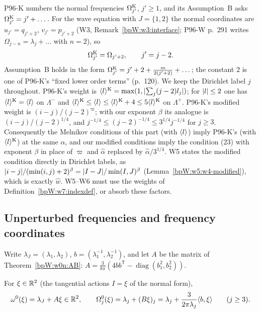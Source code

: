 \begin{remark}\label{bpW:w7:reindex}
P96-K numbers the normal frequencies $\Omega^{\rm K}_{j'}$, $j'\ge1$, and its Assumption~B asks $\Omega^{\rm K}_{j'}
=j'+\dots$. For the wave equation with $J=\{1,2\}$ the normal coordinates are $u_{j'}=q_{j'+2}$, $v_{j'}=p_{j'+2}$
(W3, Remark~\ref{bpW:w3:interface}; P96-W p.~291 writes $\Omega_{j-n}=\lambda_j+\dots$ with $n=2$), so
\[\Omega^{\rm K}_{j'}=\Omega_{j'+2},\qquad j'=j-2.\]
Assumption~B holds in the form $\Omega^{\rm K}_{j'}=j'+2+\frac{m}{2(j'+2)}+\dots$; the constant $2$ is one of P96-K's
``fixed lower order terms'' (p.~120). We keep the Dirichlet label $j$ throughout. P96-K's weight is
$\langle l\rangle^{\rm K}=\max(1,\lvert \sum_j(j-2)l_j\rvert)$; for $\lvert l\rvert\le2$ one has $\langle l\rangle^{\rm K}=\langle l\rangle$ on $\Lambda^-$ and
$\langle l\rangle^{\rm K}\le\langle l\rangle\le\langle l\rangle^{\rm K}+4\le5\langle l\rangle^{\rm K}$ on $\Lambda^+$. P96-K's modified weight is
$(i-j)/(j-2)^{\varpi}$; with our exponent $\beta$ its analogue is $(i-j)/(j-2)^{1/4}$, and
$j^{-1/4}\le(j-2)^{-1/4}\le3^{1/4}j^{-1/4}$ for $j\ge3$. Consequently the Melnikov
conditions of this part (with $\langle l\rangle$) imply P96-K's (with $\langle l\rangle^{\rm K}$) at the same $\alpha$, and our modified
conditions imply the condition (23) with exponent $\beta$ in place of $\varpi$ and $\hat\alpha$ replaced by
$\hat\alpha/3^{1/4}$. W5 states the modified condition directly in Dirichlet labels, as
$\lvert i-j\rvert/(\min(i,j)+2)^\beta=\lvert I-J\rvert/\min(I,J)^\beta$ (Lemma~\ref{bpW:w5:w4-modified}), which is exactly $\hat w$. W5--W6 must use the weights of
Definition~\ref{bpW:w7:indexdef}, or absorb these factors.
\end{remark}

\subsection{Unperturbed frequencies and frequency coordinates}\label{bpW:w7:unpert}

Write $\lambda_J=(\lambda_1,\lambda_2)$, $b=(\lambda_1^{-1},\lambda_2^{-1})$, and let $A$ be the matrix of
Theorem~\ref{bpW:w0n:AB}: $A=\frac3{8\pi}(4bb^{\mathsf T}-\operatorname{diag}(b_1^2,b_2^2))$.

\begin{definition}\label{bpW:w7:omega0}
For $\xi\in\mathbb{R}^2$ (the tangential actions $I=\xi$ of the normal form),
\[\omega^0(\xi)=\lambda_J+A\xi\in\mathbb{R}^2,\qquad
\Omega^0_j(\xi)=\lambda_j+(B\xi)_j=\lambda_j+\frac{3}{2\pi\lambda_j}\langle b,\xi\rangle\qquad(j\ge3).\]
\end{definition}

